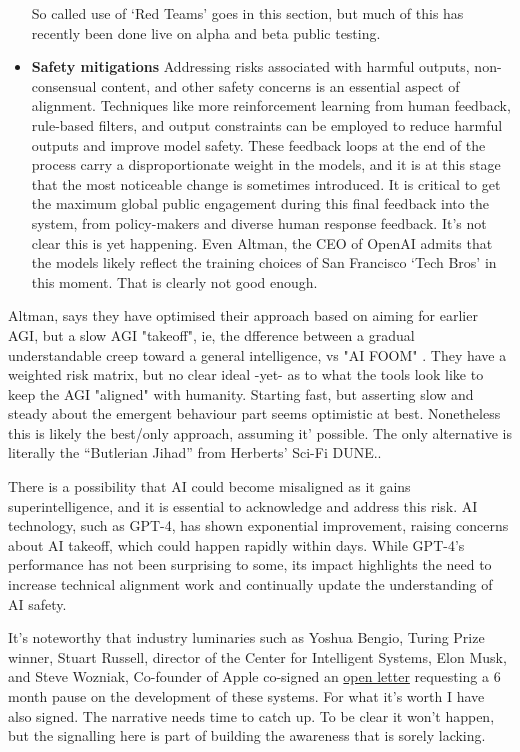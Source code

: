 \begin{itemize}
So called use of `Red Teams' goes in this section, but much of this has recently been done live on alpha and beta public testing. 
\item \textbf{Safety mitigations} Addressing risks associated with harmful outputs, non-consensual content, and other safety concerns is an essential aspect of alignment. Techniques like more reinforcement learning from human feedback, rule-based filters, and output constraints can be employed to reduce harmful outputs and improve model safety. These feedback loops at the end of the process carry a disproportionate weight in the models, and it is at this stage that the most noticeable change is sometimes introduced. It is critical to get the maximum global public engagement during this final feedback into the system, from policy-makers and diverse human response feedback. It's not clear this is yet happening. Even Altman, the CEO of OpenAI admits that the models likely reflect the training choices of San Francisco `Tech Bros' in this moment. That is clearly not good enough.
\end{itemize}
Altman, says they have optimised their approach based on aiming for earlier AGI, but a slow AGI "takeoff", ie, the dfference between a gradual understandable creep toward a general intelligence, vs "AI FOOM" \cite{yudkowsky2008hanson}. They have a weighted risk matrix, but no clear ideal -yet- as to what the tools look like to keep the AGI "aligned" with humanity. Starting fast, but asserting slow and steady about the emergent behaviour part seems optimistic at best. Nonetheless this is likely the best/only approach, assuming it' possible. The only alternative is literally the ``Butlerian Jihad'' from Herberts' Sci-Fi DUNE.\cite{song2018preventing}.\par
There is a possibility that AI could become misaligned as it gains superintelligence, and it is essential to acknowledge and address this risk. 
AI technology, such as GPT-4, has shown exponential improvement, raising concerns about AI takeoff, which could happen rapidly within days. While GPT-4's performance has not been surprising to some, its impact highlights the need to increase technical alignment work and continually update the understanding of AI safety.\par
It's noteworthy that industry luminaries such as Yoshua Bengio, Turing Prize winner, Stuart Russell, director of the Center for Intelligent Systems, Elon Musk, and Steve Wozniak, Co-founder of Apple co-signed an \href{https://futureoflife.org/open-letter/pause-giant-ai-experiments/}{open letter} requesting a 6 month pause on the development of these systems. For what it's worth I have also signed. The narrative needs time to catch up. To be clear it won't happen, but the signalling here is part of building the awareness that is sorely lacking. 
